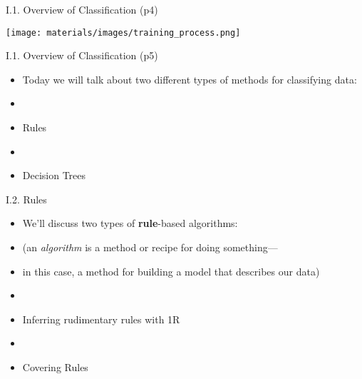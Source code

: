 \documentclass[handout]{beamer}
\newcommand{\strong}[1]{\textbf{\color{teal} #1}}
\begin{document}
\begin{frame}{I.1. Overview of Classification (p4)}
\begin{center}
\texttt{[image: materials/images/training\_process.png]}
\end{center}
\end{frame}
\begin{frame}{I.1. Overview of Classification (p5)}
\begin{itemize}
\item[] Today we will talk about two different types of methods for classifying data:
\item[]
\item Rules
\item[]
\item Decision Trees
\end{itemize}
\end{frame}
\begin{frame}{I.2. Rules}
\begin{itemize}
\item[] We'll discuss two types of \strong{rule}-based algorithms:
\item[] (an \emph{algorithm} is a method or recipe for doing something---
\item[] in this case, a method for building a model that describes our data)
\item[]
\item[I.2.1] Inferring rudimentary rules with 1R
\item[]
\item[I.2.2] Covering Rules
\end{itemize}
\end{frame}
\end{document}
